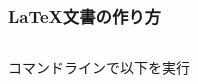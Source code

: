 \begin{frame}
	\frametitle{\LaTeX 文書の作り方}
	\begin{columns}[c]
		\begin{column}{0.5\textwidth}
			コマンドラインで以下を実行
	
	
		\end{column}
		\begin{column}{0.4\textwidth}
		\end{column}
	\end{columns}
\end{frame}

